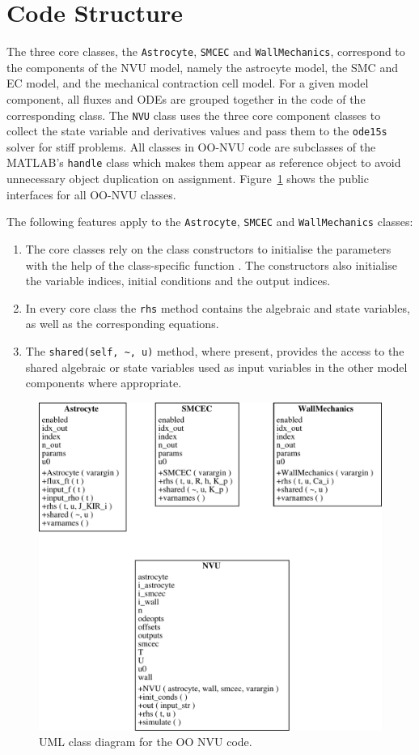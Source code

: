 \section{Code Structure}

The three core classes, the \texttt{Astrocyte}, \texttt{SMCEC} and \texttt{WallMechanics}, correspond to the components of the NVU model, namely the astrocyte model, the SMC and EC model, and the mechanical contraction cell model. For a given model component, all fluxes and ODEs are grouped together in the code of the corresponding class. The \texttt{NVU} class uses the three core component classes to collect the state variable and derivatives values and pass them to the \texttt{ode15s} solver for stiff problems. All classes in OO-NVU code are subclasses of the MATLAB's \texttt{handle} class which makes them appear as reference object to avoid unnecessary object duplication on assignment. Figure~\ref{fig:OO-Code-Structure} shows the public interfaces for all OO-NVU classes.

The following features apply to the \texttt{Astrocyte}, \texttt{SMCEC} and \texttt{WallMechanics} classes:

\begin{enumerate}
	\item The core classes rely on the class constructors to initialise the parameters with the help of the class-specific function . The constructors also initialise the variable indices, initial conditions and the output indices.
	
	\item In every core class the \texttt{rhs} method contains the algebraic and state variables, as well as the corresponding equations.
	
	\item The \texttt{shared(self, \~{}, u)} method, where present, provides the access to the shared algebraic or state variables used as input variables in the other model components where appropriate.
\end{enumerate}

\begin{figure}[htb!]
	\centering
	\includegraphics[width=0.7\linewidth]{figures/OO-Code-Structure}
	\caption[OO NVU Classes]{UML class diagram for the OO NVU code.}
	\label{fig:OO-Code-Structure}
\end{figure}


